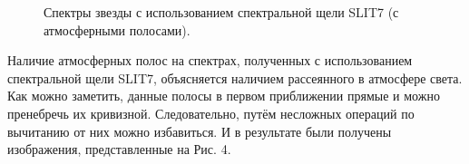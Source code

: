 \documentclass[a4paper]{article}
\begin{document}
\begin{figure}[h]
\begin{minipage}[h]{0.50\linewidth}
\end{minipage}
\caption{Спектры звезды с использованием спектральной щели SLIT7 (с атмосферными полосами).}
\label{ris:image2}
\end{figure}

Наличие атмосферных полос на спектрах, полученных с использованием спектральной щели SLIT7, объясняется наличием рассеянного в атмосфере света. Как можно заметить, данные полосы в первом приближении прямые и можно пренебречь их кривизной. Следовательно, путём несложных операций по вычитанию от них можно избавиться. И в результате были получены изображения, представленные на Рис. 4.

\begin{figure}[h]
\begin{minipage}[h]{0.50\linewidth}
\end{minipage}
\begin{minipage}[h]{0.50\linewidth}
\end{minipage}
\begin{minipage}[h]{0.50\linewidth}

\end{minipage}
\end{figure}
\end{document}
